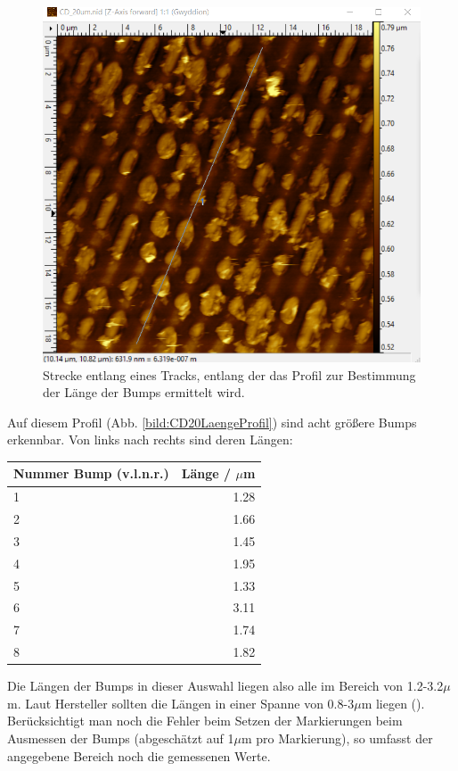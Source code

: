 \begin{figure}[h]
    \centering
    \includegraphics[scale = 0.5]{Bilder/CD20Laenge.png}
    \caption{Strecke entlang eines Tracks, entlang der das Profil zur Bestimmung der Länge der Bumps ermittelt wird.}
    \label{bild:CD20Laenge}
\end{figure}


\newpage

Auf diesem Profil (Abb. \ref{bild:CD20LaengeProfil}) sind acht größere Bumps erkennbar. Von links nach rechts 
sind deren Längen: 

\begin{center}
    \centering
    \begin{tabular}{l|r}
        Nummer Bump (v.l.n.r.) & Länge / $\mu$m \\
        \hline
        1 & 1.28\\
        2 & 1.66\\
        3 & 1.45 \\
        4 & 1.95 \\
        5 & 1.33 \\
        6 & 3.11 \\
        7 & 1.74 \\
        8 & 1.82 \\
        
    \end{tabular}
\end{center}

Die Längen der Bumps in dieser Auswahl liegen also alle im Bereich von 1.2-3.2$\mu$m. Laut Hersteller sollten die Längen in einer Spanne von 
0.8-3$\mu$m liegen (\cite{SampleKit2007}). 
Berücksichtigt man noch die Fehler beim Setzen der Markierungen beim Ausmessen der Bumps (abgeschätzt auf 1$\mu$m 
pro Markierung), so umfasst der angegebene Bereich noch die gemessenen Werte. 
\clearpage
